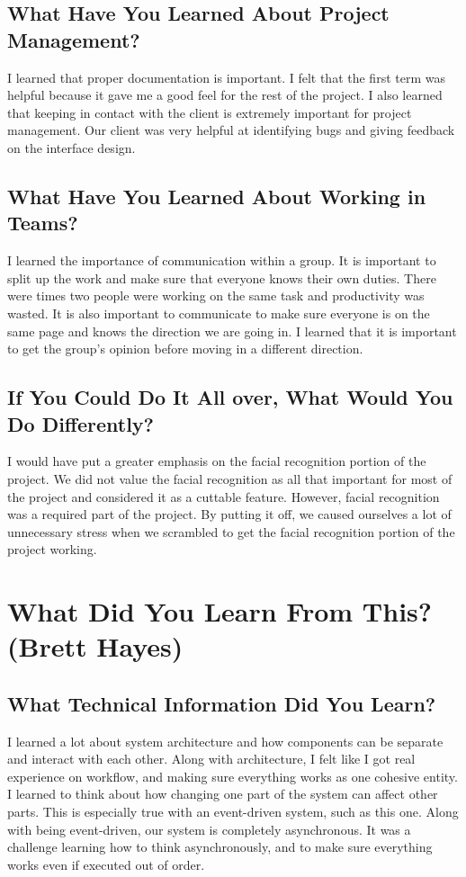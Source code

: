 \documentclass[10pt, onecolumn, twoside, peerreview]{IEEEtran}
\begin{document}
\subsection{What Have You Learned About Project Management?}
I learned that proper documentation is important. I felt that the first term was helpful because it gave me a good feel for the rest of the project. I also learned that keeping in contact with the client is extremely important for project management. Our client was very helpful at identifying bugs and giving feedback on the interface design.

\subsection{What Have You Learned About Working in Teams?}
I learned the importance of communication within a group. It is important to split up the work and make sure that everyone knows their own duties. There were times two people were working on the same task and productivity was wasted. It is also important to communicate to make sure everyone is on the same page and knows the direction we are going in. I learned that it is important to get the group's opinion before moving in a different direction.

\subsection{If You Could Do It All over, What Would You Do Differently?}
I would have put a greater emphasis on the facial recognition portion of the project. We did not value the facial recognition as all that important for most of the project and considered it as a cuttable feature. However, facial recognition was a required part of the project. By putting it off, we caused ourselves a lot of unnecessary stress when we scrambled to get the facial recognition portion of the project working.


\section{What Did You Learn From This? (Brett Hayes)}
\subsection{What Technical Information Did You Learn?}
I learned a lot about system architecture and how components can be separate and interact with each other. Along with architecture, I felt like I got real experience on workflow, and making sure everything works as one cohesive entity. I learned to think about how changing one part of the system can affect other parts. This is especially true with an event-driven system, such as this one. Along with being event-driven, our system is completely asynchronous. It was a challenge learning how to think asynchronously, and to make sure everything works even if executed out of order.
\end{document}
